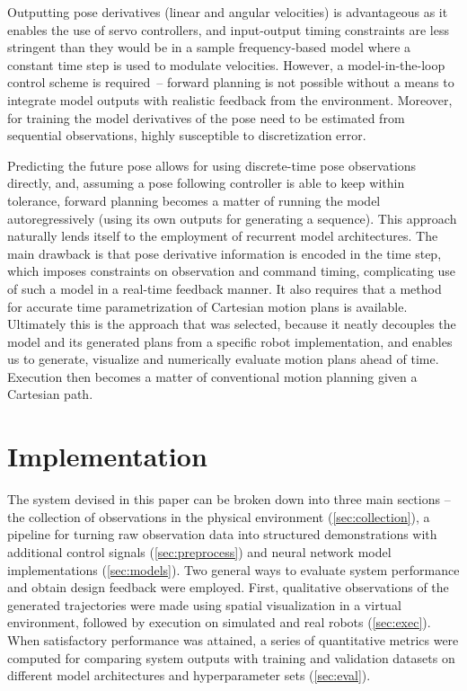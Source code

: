\documentclass{article}
\begin{document}
Outputting pose derivatives (linear and angular velocities) is advantageous as it enables the use of servo controllers, and input-output timing constraints are less stringent than they would be in a sample frequency-based model where a constant time step is used to modulate velocities. However, a model-in-the-loop control scheme is required~-- forward planning is not possible without a means to integrate model outputs with realistic feedback from the environment. Moreover, for training the model derivatives of the pose need to be estimated from sequential observations, highly susceptible to discretization error. 

Predicting the future pose allows for using discrete-time pose observations directly, and, assuming a pose following controller is able to keep within tolerance, forward planning becomes a matter of running the model autoregressively (using its own outputs for generating a sequence). This approach naturally lends itself to the employment of recurrent model architectures. The main drawback is that pose derivative information is encoded in the time step, which imposes constraints on observation and command timing, complicating use of such a model in a real-time feedback manner. It also requires that a method for accurate time parametrization of Cartesian motion plans is available. Ultimately this is the approach that was selected, because it neatly decouples the model and its generated plans from a specific robot implementation, and enables us to generate, visualize and numerically evaluate motion plans ahead of time. Execution then becomes a matter of conventional motion planning given a Cartesian path.


\section{Implementation}
\label{sec:materials}

The system devised in this paper can be broken down into three main sections -- the collection of observations in the physical environment (\ref{sec:collection}), a pipeline for turning raw observation data into structured demonstrations with additional control signals (\ref{sec:preprocess}) and neural network model implementations (\ref{sec:models}). Two general ways to evaluate system performance and obtain design feedback were employed. First, qualitative observations of the generated trajectories were made using spatial visualization in a virtual environment, followed by execution on simulated and real robots (\ref{sec:exec}). When satisfactory performance was attained, a series of quantitative metrics were computed for comparing system outputs with training and validation datasets on different model architectures and hyperparameter sets (\ref{sec:eval}).
\end{document}
